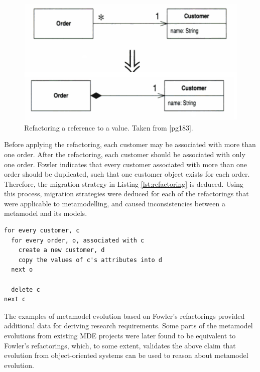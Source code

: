 \begin{figure}[htbp]
  \begin{center}
    \leavevmode
    \includegraphics[scale=0.5]{4.Analysis/exemplar_refactoring.pdf}
  \end{center}
  \caption[Refactoring a reference to a value]{Refactoring a reference to a value. Taken from \cite{fowler99refactoring}[pg183].}
  \label{fig:refactoring}
\end{figure}

Before applying the refactoring, each customer may be associated with more than one order. After the refactoring, each customer should be associated with only one order. Fowler indicates that every customer associated with more than one order should be duplicated, such that one customer object exists for each order. Therefore, the migration strategy in Listing \ref{lst:refactoring} is deduced. Using this process, migration strategies were deduced for each of the refactorings that were applicable to metamodelling, and caused inconsistencies between a metamodel and its models.

\begin{lstlisting}[caption=Migration strategy for the refactoring in pseudo code., label=lst:refactoring]
for every customer, c
  for every order, o, associated with c
    create a new customer, d
    copy the values of c's attributes into d
  next o
	
  delete c
next c
\end{lstlisting}

The examples of metamodel evolution based on Fowler's refactorings provided additional data for deriving research requirements. Some parts of the metamodel evolutions from existing MDE projects were later found to be equivalent to Fowler's refactorings, which, to some extent, validates the above claim that evolution from object-oriented systems can be used to reason about metamodel evolution.

